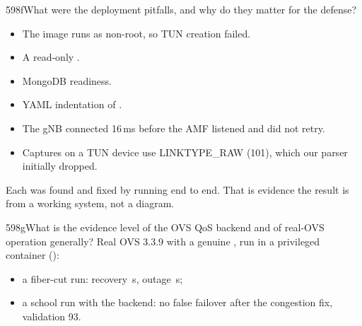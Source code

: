 \begin{qa}{598f}{What were the deployment pitfalls, and why do they matter for the defense?}
\begin{itemize}
\item The image runs as non-root, so TUN creation failed.
\item A read-only .
\item MongoDB readiness.
\item YAML indentation of .
\item The gNB connected 16\,ms before the AMF listened and did not retry.
\item Captures on a TUN device use LINKTYPE\_RAW (101), which our parser initially dropped.
\end{itemize}
Each was found and fixed by running end to end. That is evidence the result is from a working system, not a diagram.
\end{qa}

\begin{qa}{598g}{What is the evidence level of the OVS QoS backend and of real-OVS operation generally?}
Real OVS 3.3.9 with a genuine , run in a privileged container (\Lthreeovs):
\begin{itemize}
\item a fiber-cut run: recovery \NOvsMttrAfter\,s, outage \NOvsOutageAfter\,s;
\item a school run with the  backend: no false failover after the congestion fix, validation 93.
\end{itemize}
\end{qa}
